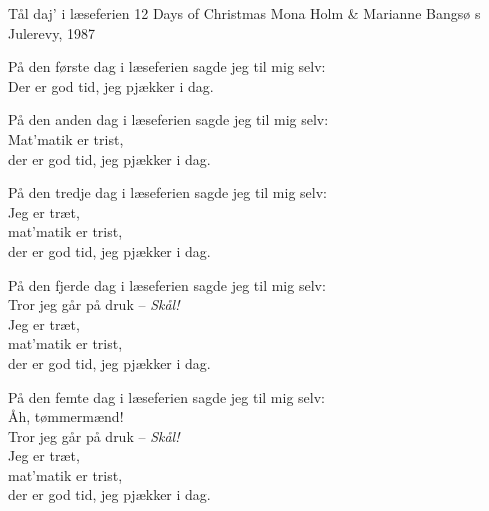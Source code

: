 \begin{song}{Tål daj' i læseferien}
  {} %
  {12 Days of Christmas} %
  {Mona Holm \& Marianne Bangsø} %
  {\TKET{}s Julerevy, 1987} %
  {\NotCCLIed} %

  \begin{SBVerse}
    På den første dag i læseferien sagde jeg til mig selv:\\
    Der er god tid, jeg pjækker i dag.
  \end{SBVerse}

  \begin{SBVerse}
    På den anden dag i læseferien sagde jeg til mig selv:\\
    Mat’matik er trist,\\
    der er god tid, jeg pjækker i dag.
  \end{SBVerse}

  \begin{SBVerse}
    På den tredje dag i læseferien sagde jeg til mig selv:\\
    Jeg er træt,\\
    mat’matik er trist,\\
    der er god tid, jeg pjækker i dag.
  \end{SBVerse}

  \begin{SBVerse}
    På den fjerde dag i læseferien sagde jeg til mig selv:\\
    Tror jeg går på druk -- \emph{Skål!}\\
    Jeg er træt,\\
    mat’matik er trist,\\
    der er god tid, jeg pjækker i dag.
  \end{SBVerse}

  \begin{SBVerse}
    På den femte dag i læseferien sagde jeg til mig selv:\\
    Åh, tømmermænd!\\
    Tror jeg går på druk -- \emph{Skål!}\\
    Jeg er træt,\\
    mat’matik er trist,\\
    der er god tid, jeg pjækker i dag.
  \end{SBVerse}


\end{song}
